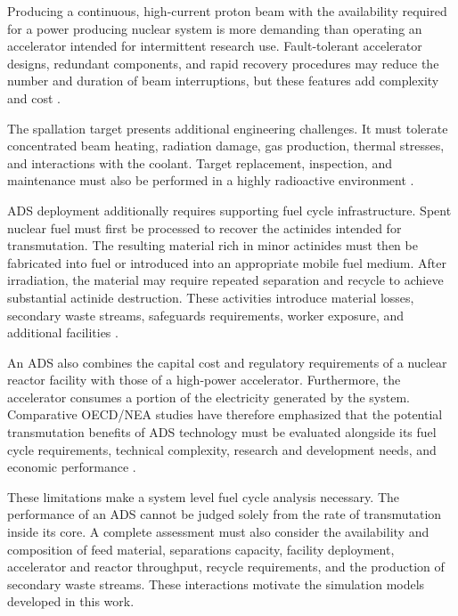 Producing a continuous, high-current proton beam with the availability
required for a power producing nuclear system is more demanding than
operating an accelerator intended for intermittent research use.
Fault-tolerant accelerator designs, redundant components, and rapid recovery
procedures may reduce the number and duration of beam interruptions, but
these features add complexity and cost
\cite{nea_ads_components_2010}.

The spallation target presents additional engineering challenges. It must
tolerate concentrated beam heating, radiation damage, gas production,
thermal stresses, and interactions with the coolant. Target replacement,
inspection, and maintenance must also be performed in a highly radioactive
environment \cite{nea_ads_components_2010}.

\gls{ADS} deployment additionally requires supporting fuel cycle infrastructure.
Spent nuclear fuel must first be processed to recover the actinides intended
for transmutation. The resulting material rich in minor actinides must then be
fabricated into fuel or introduced into an appropriate mobile fuel medium.
After irradiation, the material may require repeated separation and recycle
to achieve substantial actinide destruction. These activities introduce
material losses, secondary waste streams, safeguards requirements, worker
exposure, and additional facilities \cite{iaea_ma_fuels_2009}.

An \gls{ADS} also combines the capital cost and regulatory requirements of a
nuclear reactor facility with those of a high-power accelerator. Furthermore,
the accelerator consumes a portion of the electricity generated by the
system. Comparative \gls{OECD}/\gls{NEA} studies have therefore emphasized that the
potential transmutation benefits of \gls{ADS} technology must be evaluated
alongside its fuel cycle requirements, technical complexity, research and
development needs, and economic performance \cite{eriksson_ads_safety_2004}.

These limitations make a system level fuel cycle analysis necessary. The
performance of an \gls{ADS} cannot be judged solely from the rate of transmutation
inside its core. A complete assessment must also consider the availability
and composition of feed material, separations capacity, facility deployment,
accelerator and reactor throughput, recycle requirements, and the production
of secondary waste streams. These interactions motivate the \Cyclus
simulation models developed in this work.



